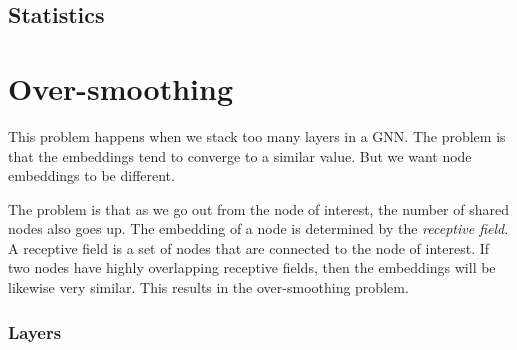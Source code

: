 \documentclass{article}
\begin{document}
\subsection{Statistics}




\section{Over-smoothing}

This problem happens when we stack too many layers in a GNN. The 
problem is that the embeddings tend to converge to a similar value. 
But we want node embeddings to be different.

The problem is that as we go out from the node of interest, the number of 
shared nodes also goes up. The embedding of a node is determined by the \emph{receptive field}. A receptive field is a set of nodes that are connected to the node of interest. If two nodes have highly overlapping receptive fields, then the embeddings will be likewise very similar. This results in the over-smoothing problem.

\subsubsection{Layers}
\end{document}
